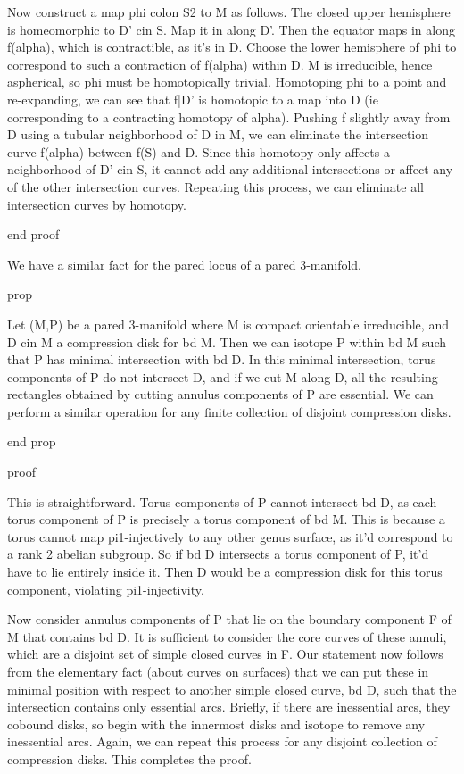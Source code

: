 Now construct a map phi colon S2 to M as follows. The closed upper hemisphere
is homeomorphic to D' cin S. Map it in along D'. Then the equator maps in along
f(alpha), which is contractible, as it's in D. Choose the lower hemisphere of
phi to correspond to such a contraction of f(alpha) within D. M is irreducible,
hence aspherical, so phi must be homotopically trivial. Homotoping phi to
a point and re-expanding, we can see that f|D' is homotopic to a map into D (ie
corresponding to a contracting homotopy of alpha). Pushing f slightly away from
D using a tubular neighborhood of D in M, we can eliminate the intersection
curve f(alpha) between f(S) and D. Since this homotopy only affects
a neighborhood of D' cin S, it cannot add any additional intersections or
affect any of the other intersection curves. Repeating this process, we can
eliminate all intersection curves by homotopy.

end proof

We have a similar fact for the pared locus of a pared 3-manifold.

prop

Let (M,P) be a pared 3-manifold where M is compact orientable irreducible, and
D cin M a compression disk for bd M. Then we can isotope P within bd M such
that P has minimal intersection with bd D. In this minimal intersection, torus
components of P do not intersect D, and if we cut M along D, all the resulting
rectangles obtained by cutting annulus components of P are essential. We can
perform a similar operation for any finite collection of disjoint compression
disks.

end prop

proof

This is straightforward. Torus components of P cannot intersect bd D, as each
torus component of P is precisely a torus component of bd M. This is because
a torus cannot map pi1-injectively to any other genus surface, as it'd
correspond to a rank 2 abelian subgroup. So if bd D intersects a torus
component of P, it'd have to lie entirely inside it. Then D would be
a compression disk for this torus component, violating pi1-injectivity.

Now consider annulus components of P that lie on the boundary component F of
M that contains bd D. It is sufficient to consider the core curves of these
annuli, which are a disjoint set of simple closed curves in F. Our statement
now follows from the elementary fact (about curves on surfaces) that we can put
these in minimal position with respect to another simple closed curve, bd D,
such that the intersection contains only essential arcs. Briefly, if there are
inessential arcs, they cobound disks, so begin with the innermost disks and
isotope to remove any inessential arcs. Again, we can repeat this process for
any disjoint collection of compression disks. This completes the proof.

